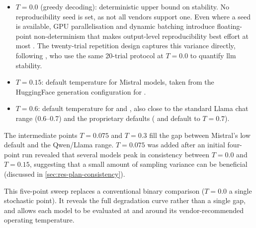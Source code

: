 \begin{itemize}
  \item $T = 0.0$ (greedy decoding): deterministic upper bound on stability.
    No reproducibility seed is set, as not all vendors support one.
    Even where a seed is available, GPU parallelisation and dynamic
    batching introduce floating-point non-determinism that makes
    output-level reproducibility best effort at most
    \parencite{HITR7PL4}. The twenty-trial repetition design captures
    this variance directly, following \textcite{WA4QD3UE}, who use the
    same 20-trial protocol at $T = 0.0$ to quantify \gls{llm} stability.
  \item $T = 0.15$: default temperature for Mistral models, taken from the
    HuggingFace generation configuration for .
  \item $T = 0.6$: default temperature for  and
    , also close to the standard Llama chat range
    (0.6--0.7) and the proprietary defaults ( and
     default to $T = 0.7$).
\end{itemize}

The intermediate points $T = 0.075$ and $T = 0.3$ fill the gap between
Mistral's low default and the Qwen/Llama range. $T = 0.075$ was added
after an initial four-point run revealed that several models peak in
consistency between $T = 0.0$ and $T = 0.15$, suggesting that a small
amount of sampling variance can be beneficial (discussed in
\autoref{sec:res-plan-consistency}).

This five-point sweep replaces a conventional binary comparison
($T = 0.0$ \vs a single stochastic point). It reveals the full degradation
curve rather than a single gap, and allows each model to be evaluated at
and around its vendor-recommended operating temperature.



